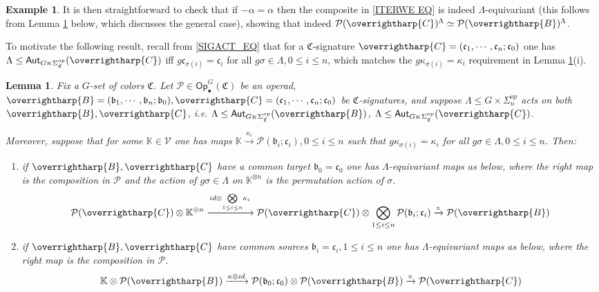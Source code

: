 \documentclass[a4paper,10pt
,draft
]{article}%
\numberwithin{equation}{section}
\numberwithin{figure}{section}
\newtheorem{lemma}[equation]{Lemma}%
\theoremstyle{definition} %
\newtheorem{example}[equation]{Example}%
\newcommand{\vect}[1]{\text{\overrightharp{\ensuremath{#1}}}}
\newcommand{\V}{\ensuremath{\mathcal V}}
\renewcommand{\P}{\ensuremath{\mathcal P}}
\newcommand{\1}{\ensuremath{\mathbbm 1}}%
\begin{document}
\begin{example}
It is then straightforward to check that if $-\alpha = \alpha$
then the composite in \eqref{ITERWE EQ}
is indeed $\Lambda$-equivariant
(this follows from Lemma \ref{LAMBEQMAPS LEM} below, which discusses the general case), showing that indeed
$\P(\vect{C})^{\Lambda} \simeq \P(\vect{B})^{\Lambda}$.
\end{example}


To motivate the following result, recall from \eqref{SIGACT_EQ} that
for a $\mathfrak{C}$-signature
$\vect{C} = (\mathfrak{c}_1,\cdots,\mathfrak{c}_n;\mathfrak{c}_0)$
one has $\Lambda \leq \mathsf{Aut}_{G \ltimes \Sigma^{op}_{\mathfrak{C}}}(\vect{C})$
iff 
$g \mathfrak{c}_{\sigma(i)} = \mathfrak{c}_i$
for all $g\sigma \in \Lambda, 0\leq i \leq n$,
which matches the $g \kappa_{\sigma(i)} = \kappa_i$
requirement in Lemma \ref{LAMBEQMAPS LEM}(i).


\begin{lemma}\label{LAMBEQMAPS LEM}
Fix a $G$-set of colors $\mathfrak{C}$.
Let $\P \in \mathsf{Op}^G_\bullet(\mathfrak{C})$ be an operad,
$\vect{B}=(\mathfrak{b}_1,\cdots,\mathfrak{b}_n;\mathfrak{b}_0),\vect{C}=(\mathfrak{c}_1,\cdots,\mathfrak{c}_n;\mathfrak{c}_0)$ be $\mathfrak{C}$-signatures,
and suppose 
$\Lambda \leq G \times \Sigma_n^{op}$
acts on both $\vect{B},\vect{C}$, i.e. 
$\Lambda \leq \mathsf{Aut}_{G\ltimes \Sigma_{\mathfrak{C}}^{op}}(\vect{B})$, 
$\Lambda \leq \mathsf{Aut}_{G\ltimes \Sigma_{\mathfrak{C}}^{op}}(\vect{C})$.

Moreover, suppose that for some $\mathbb{K} \in \V$
one has maps 
$\mathbb{K} \xrightarrow{\kappa_i} \P(\mathfrak{b}_i;\mathfrak{c}_i), 0\leq i \leq n$
such that $g\kappa_{\sigma(i)} = \kappa_i$ for all $g\sigma\in \Lambda,0\leq i \leq n$. Then:
\begin{enumerate}[label=(\roman*)]
\item if $\vect{B},\vect{C}$ have a common target $\mathfrak{b}_0=\mathfrak{c}_0$
one has
$\Lambda$-equivariant maps as below, where the right map is the composition in $\P$
and the action of $g\sigma\in \Lambda$ on $\mathbb{K}^{\otimes n}$
is the permutation action of $\sigma$.
\begin{equation}\label{LAMBEQMAPS EQ}
	\P(\vect{C}) \otimes %
	\mathbb{K}^{\otimes n}
\xrightarrow{id \otimes \underset{1\leq i \leq n}{\bigotimes} \kappa_i}
	\P(\vect{C}) \otimes \bigotimes_{1\leq i \leq n} \P(\mathfrak{b}_i;\mathfrak{c}_i)
	\xrightarrow{\circ}
	\P(\vect{B})
\end{equation}
\item
if $\vect{B},\vect{C}$ have common sources $\mathfrak{b}_i=\mathfrak{c}_i,1\leq i \leq n$ 
one has
$\Lambda$-equivariant maps as below, where the right map is the composition in $\P$.
\[
	\mathbb{K} \otimes \P(\vect{B}) 
\xrightarrow{\kappa \otimes id}
	\P(\mathfrak{b}_0;\mathfrak{c}_0) \otimes \P(\vect{B}) 
	\xrightarrow{\circ}
	\P(\vect{C})
\]
\end{enumerate}
\end{lemma}
\end{document}
